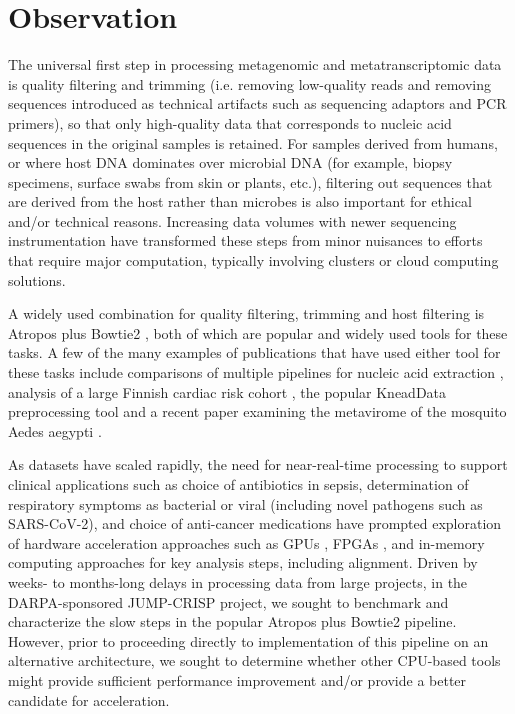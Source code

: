 \section{Observation}

The universal first step in processing metagenomic and metatranscriptomic data is quality filtering and trimming (i.e. removing low-quality reads and removing sequences introduced as technical artifacts such as sequencing adaptors and PCR primers), so that only high-quality data that corresponds to nucleic acid sequences in the original samples is retained. For samples derived from humans, or where host DNA dominates over microbial DNA (for example, biopsy specimens, surface swabs from skin or plants, etc.), filtering out sequences that are derived from the host rather than microbes is also important for ethical and/or technical reasons. Increasing data volumes with newer sequencing instrumentation have transformed these steps from minor nuisances to efforts that require major computation, typically involving clusters or cloud computing solutions.

A widely used combination for quality filtering, trimming and host filtering is Atropos \cite{Didion2017-pl} plus Bowtie2 \cite{Langmead2012-lz}, both of which are popular and widely used tools for these tasks. A few of the many examples of publications that have used either tool for these tasks include comparisons of multiple pipelines for nucleic acid extraction \cite{Shaffer2021-mf}, analysis of a large Finnish cardiac risk cohort \cite{Salosensaari2021-qf}, the popular KneadData preprocessing tool \cite{McIver2018-rk} and a recent paper examining the metavirome of the mosquito Aedes aegypti \cite{Ramos-Nino2020-tr}. 

As datasets have scaled rapidly, the need for near-real-time processing to support clinical applications such as choice of antibiotics in sepsis, determination of respiratory symptoms as bacterial or viral (including novel pathogens such as SARS-CoV-2), and choice of anti-cancer medications have prompted exploration of hardware acceleration approaches such as GPUs  \cite{Sandes2016-tj}, FPGAs \cite{Shah2013-ot}, and in-memory computing approaches \cite{Gupta2019-sd} for key analysis steps, including alignment. Driven by weeks- to months-long delays in processing data from large projects, in the DARPA-sponsored JUMP-CRISP project, we sought to benchmark and characterize the slow steps in the popular Atropos plus Bowtie2 pipeline. However, prior to proceeding directly to implementation of this pipeline on an alternative architecture, we sought to determine whether other CPU-based tools might provide sufficient performance improvement and/or provide a better candidate for acceleration.

